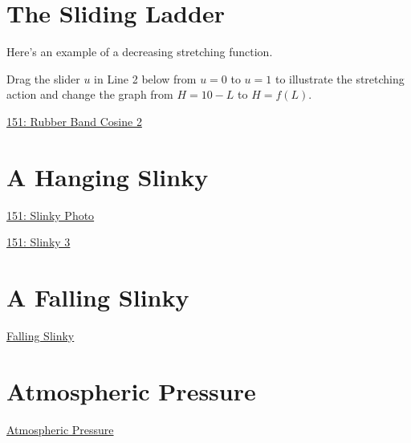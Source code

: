\documentclass{ximera}
\begin{document}
\section{The Sliding Ladder}

\begin{exploration} \label{Ex:LKDMNDFDSAdsa}
Here's an example of a decreasing stretching function.

Drag the slider $u$ in Line 2 below from $u=0$ to $u=1$ to illustrate the stretching action and change the graph from $H=10-L$ to $H=f(L)$.
\begin{onlineOnly}
    \begin{center}
\end{center}
\end{onlineOnly}

\href{https://www.desmos.com/calculator/04kfcfukfy}{151: Rubber Band Cosine 2}


\end{exploration}

\section{A Hanging Slinky}

\begin{onlineOnly}
    \begin{center}
\end{center}
\end{onlineOnly}

\href{https://www.desmos.com/calculator/zqjjgael5j}{151: Slinky Photo}



\begin{onlineOnly}
    \begin{center}
\end{center}
\end{onlineOnly}

\href{https://www.desmos.com/calculator/ew24lplwqf}{151: Slinky 3}



\section{A Falling Slinky}

\href{https://www.youtube.com/watch?v=eCMmmEEyOO0}{Falling Slinky}


\section{Atmospheric Pressure}

\href{https://projects.iq.harvard.edu/files/acmg/files/intro_atmo_chem_bookchap2.pdf}{Atmospheric Pressure} 
\end{document}
